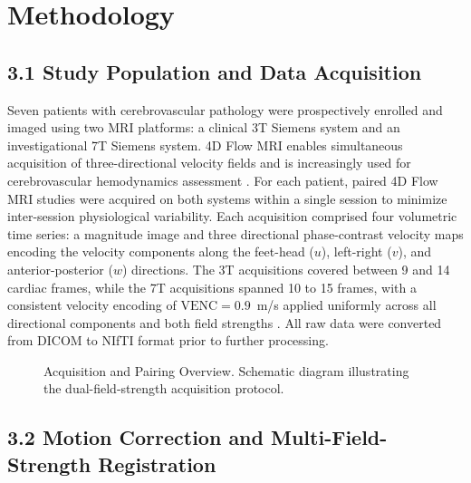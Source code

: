 \section*{Methodology}

\subsection*{3.1 Study Population and Data Acquisition}

Seven patients with cerebrovascular pathology were prospectively enrolled and imaged using two MRI platforms: a clinical 3T Siemens system and an investigational 7T Siemens system. 4D Flow MRI enables simultaneous acquisition of three-directional velocity fields and is increasingly used for cerebrovascular hemodynamics assessment \cite{markl2012,dyverfeldt2015}. For each patient, paired 4D Flow MRI studies were acquired on both systems within a single session to minimize inter-session physiological variability. Each acquisition comprised four volumetric time series: a magnitude image and three directional phase-contrast velocity maps encoding the velocity components along the feet-head ($u$), left-right ($v$), and anterior-posterior ($w$) directions. The 3T acquisitions covered between 9 and 14 cardiac frames, while the 7T acquisitions spanned 10 to 15 frames, with a consistent velocity encoding of $\text{VENC} = 0.9$~m/s applied uniformly across all directional components and both field strengths \cite{bock2010}. All raw data were converted from DICOM to NIfTI format prior to further processing.

\begin{figure}[h]
    \centering
    \caption{Acquisition and Pairing Overview. Schematic diagram illustrating the dual-field-strength acquisition protocol.}
    \label{fig:acquisition}
\end{figure}

\subsection*{3.2 Motion Correction and Multi-Field-Strength Registration}

